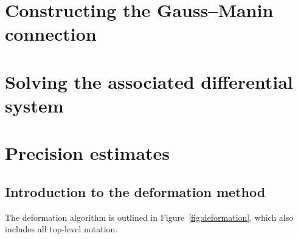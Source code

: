 \chapter{Constructing the Gauss--Manin connection}


\chapter{Solving the associated differential system}


\chapter{Precision estimates}

\section{Introduction to the deformation method}

The deformation algorithm is outlined in Figure~\ref{fig:deformation}, 
which also includes all top-level notation.

